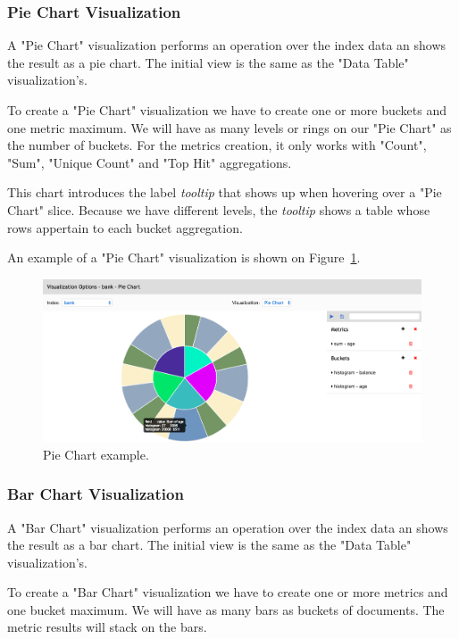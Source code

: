 \documentclass[a4paper, 12pt, english]{book}
\begin{document}
\subsubsection{Pie Chart Visualization}
\label{sec:pie-chart-visualization}
A "Pie Chart" visualization performs an operation over the index data an shows the result as a pie chart. The initial view is the same as the "Data Table" visualization's.

To create a "Pie Chart" visualization we have to create one or more buckets and one metric maximum. We will have as many levels or rings on our "Pie Chart" as the number of buckets. For the metrics creation, it only works with "Count", "Sum", "Unique Count" and "Top Hit" aggregations.

This chart introduces the label \textit{tooltip} that shows up when hovering over a "Pie Chart" slice. Because we have different levels, the \textit{tooltip} shows a table whose rows appertain to each bucket aggregation.

An example of a "Pie Chart" visualization is shown on Figure~\ref{fig:pie-chart-calculation}.

\begin{figure}
  \centering
  \includegraphics[width=16cm, keepaspectratio]{img/pie-chart-calculation.png}
  \caption{Pie Chart example.}
  \label{fig:pie-chart-calculation}
\end{figure}

\subsubsection{Bar Chart Visualization}
\label{sec:bar-chart-visualization}
A "Bar Chart" visualization performs an operation over the index data an shows the result as a bar chart. The initial view is the same as the "Data Table" visualization's.

To create a "Bar Chart" visualization we have to create one or more metrics and one bucket maximum. We will have as many bars as buckets of documents. The metric results will stack on the bars.
\end{document}
